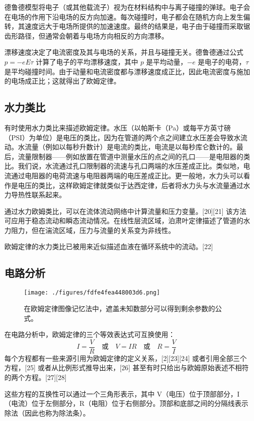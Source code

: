 德鲁德模型将电子（或其他载流子）视为在材料结构中与离子碰撞的弹球。电子会在电场的作用下沿电场的反方向加速。每次碰撞时，电子都会在随机方向上发生偏转，其速度远大于电场所提供的加速速度。最终的结果是，电子由于碰撞而采取锯齿形路径，但通常会朝着与电场方向相反的方向漂移。

漂移速度决定了电流密度及其与电场的关系，并且与碰撞无关。德鲁德通过公式 \( p = -eE\tau \) 计算了电子的平均漂移速度，其中 \( p \) 是平均动量，\( -e \) 是电子的电荷，\( \tau \) 是平均碰撞时间。由于动量和电流密度都与漂移速度成正比，因此电流密度与施加的电场成正比；这就得出了欧姆定律。
\subsection{水力类比}

有时使用水力类比来描述欧姆定律。水压（以帕斯卡（Pa）或每平方英寸磅（PSI）为单位）是电压的类比，因为在管道的两个点之间建立水压差会导致水流动。水流量（例如以每秒升数计）是电流的类比，电流是以每秒库仑数计的。最后，流量限制器——例如放置在管道中测量水压的点之间的孔口——是电阻器的类比。我们说，水流通过孔口限制器的流速与孔口两端的水压差成正比。类似地，电流通过电阻器的电荷流速与电阻器两端的电压差成正比。更一般地，水力头可以看作是电压的类比，这样欧姆定律就类似于达西定律，后者将水力头与水流量通过水力导热性联系起来。

通过水力欧姆类比，可以在流体流动网络中计算流量和压力变量。[20][21] 该方法可应用于稳态流动和瞬态流动情况。在线性层流区域，泊肃叶定律描述了管道的水力阻力，但在湍流区域，压力与流量的关系变为非线性。

欧姆定律的水力类比已被用来近似描述血液在循环系统中的流动。[22]
\subsection{电路分析}
\begin{figure}[ht]
\centering
\texttt{[image: ./figures/fdfe4fea448003d6.png]}
\caption{在欧姆定律图像记忆法中，遮盖未知数部分可以得到剩余参数的公式。} \label{fig_OuMu_6}
\end{figure}
在电路分析中，欧姆定律的三个等效表达式可互换使用：
\[
I = \frac{V}{R} \quad \text{或} \quad V = IR \quad \text{或} \quad R = \frac{V}{I}~
\]
每个方程都有一些来源引用为欧姆定律的定义关系，[2][23][24] 或者引用全部三个方程，[25] 或者从比例形式推导出来，[26] 甚至有时只给出与欧姆原始表述不相符的两个方程。[27][28]

这些方程的互换性可以通过一个三角形表示，其中 V（电压）位于顶部部分，I（电流）位于左侧部分，R（电阻）位于右侧部分。顶部和底部之间的分隔线表示除法（因此也称为除法条）。
